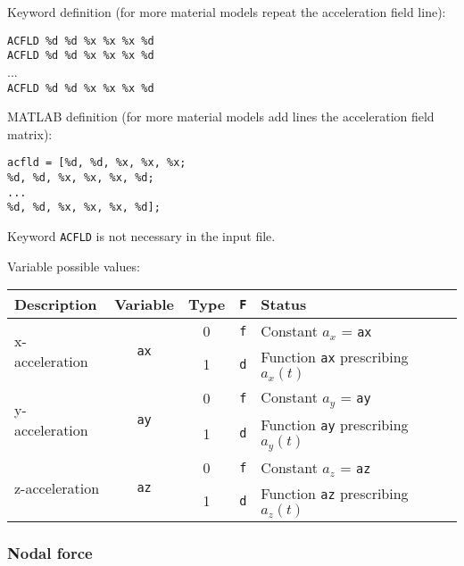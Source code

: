 Keyword definition (for more material models repeat the acceleration field line):

\begin{tcolorbox}
\texttt{ACFLD \%d \%d \%x \%x \%x \%d} \\
\texttt{ACFLD \%d \%d \%x \%x \%x \%d} \\
... \\
\texttt{ACFLD \%d \%d \%x \%x \%x \%d}
\end{tcolorbox}

MATLAB definition (for more material models add lines the acceleration field matrix):

\begin{tcolorbox}
\texttt{acfld = [\%d, \%d, \%x, \%x, \%x; \\
\%d, \%d, \%x, \%x, \%x, \%d; \\
... \\
\%d, \%d, \%x, \%x, \%x, \%d];}
\end{tcolorbox}

Keyword \texttt{ACFLD} is not necessary in the input file.

Variable possible values:

\begin{tabular}{|l|c|c|c|l|}
\hline
{\bf Description} & {\bf Variable} & {\bf Type} & \texttt{\bf F} & {\bf Status} \\ \hline
\multirow{2}{*}{x-acceleration} & \multirow{2}{*}{\texttt{ax}} & 0 & \texttt{f} & Constant $a_x$ = \texttt{ax} \\ \cline{3-5}
& & 1 & \texttt{d} & Function \texttt{ax} prescribing $a_x(t)$ \\ \hline
\multirow{2}{*}{y-acceleration} & \multirow{2}{*}{\texttt{ay}} & 0 & \texttt{f} & Constant $a_y$ = \texttt{ay} \\ \cline{3-5}
& & 1 & \texttt{d} & Function \texttt{ay} prescribing $a_y(t)$ \\ \hline
\multirow{2}{*}{z-acceleration} & \multirow{2}{*}{\texttt{az}} & 0 & \texttt{f} & Constant $a_z$ = \texttt{az} \\ \cline{3-5}
& & 1 & \texttt{d} & Function \texttt{az} prescribing $a_z(t)$ \\ \hline
\end{tabular}

\newpage


\subsubsection{Nodal force}

